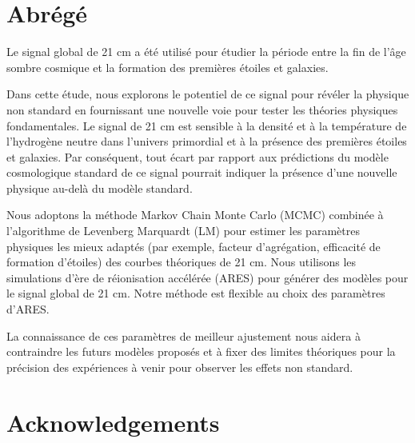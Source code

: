 \documentclass[12pt, TexShade, letterpaper]{report}
\begin{document}
\chapter*{Abrégé}
	\label{chap:frAbstract}
Le signal global de 21 cm a été utilisé pour étudier la période entre la fin de l'âge sombre cosmique et la formation des premières étoiles et galaxies. \par
Dans cette étude, nous explorons le potentiel de ce signal pour révéler la physique non standard en fournissant une nouvelle voie pour tester les théories physiques fondamentales. Le signal de 21 cm est sensible à la densité et à la température de l'hydrogène neutre dans l'univers primordial et à la présence des premières étoiles et galaxies. Par conséquent, tout écart par rapport aux prédictions du modèle cosmologique standard de ce signal pourrait indiquer la présence d'une nouvelle physique au-delà du modèle standard.\par
Nous adoptons la méthode Markov Chain Monte Carlo (MCMC) combinée à l'algorithme de Levenberg Marquardt (LM) pour estimer les paramètres physiques les mieux adaptés (par exemple, facteur d'agrégation, efficacité de formation d'étoiles) des courbes théoriques de 21 cm. Nous utilisons les simulations d'ère de réionisation accélérée (ARES) pour générer des modèles pour le signal global de 21 cm. Notre méthode est flexible au choix des paramètres d'ARES.\par
La connaissance de ces paramètres de meilleur ajustement nous aidera à contraindre les futurs modèles proposés et à fixer des limites théoriques pour la précision des expériences à venir pour observer les effets non standard.\par
\chapter*{Acknowledgements}
	\label{chap:acknowledgments}
\end{document}
